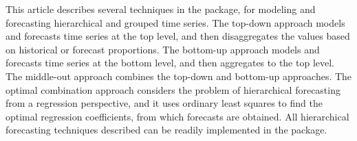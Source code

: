 \documentclass[nojss]{jss}
\begin{document}
This article describes several techniques in the  package, for modeling and forecasting hierarchical and grouped time series. The top-down approach models and forecasts time series at the top level, and then disaggregates the values based on historical or forecast proportions. The bottom-up approach models and forecasts time series at the bottom level, and then aggregates to the top level. The middle-out approach combines the top-down and bottom-up approaches. The optimal combination approach considers the problem of hierarchical forecasting from a regression perspective, and it uses ordinary least squares to find the optimal regression coefficients, from which forecasts are obtained. All hierarchical forecasting techniques described can be readily implemented in the  package.

 

\end{document}
